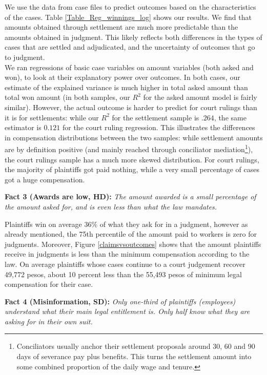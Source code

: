 \documentclass[11pt]{article}
\begin{document}
We use the data from case files to predict outcomes based on the characteristics of the cases. Table \ref{Table_Reg_winnings_log} shows our results. We find that amounts obtained through settlement are much more predictable than the amounts obtained in judgment. This likely reflects both differences in the types of cases that are settled and adjudicated, and the uncertainty of outcomes that go to judgment.   
\\
We ran regressions of basic case variables on amount variables (both asked and won), to look at their explanatory power over outcomes. In both cases, our estimate of the explained variance is much higher in total asked amount than total won amount (in both samples, our $R^2$ for the asked amount model is fairly similar). However, the actual outcome is harder to predict for court rulings than it is for settlements: while our $R^2$ for the settlement sample is $.264$, the same estimator is $0.121$ for the court ruling regression. This illustrates the differences in compensation distributions between the two samples: while settlement amounts are by definition positive (and mainly reached through conciliator mediation\footnote{Conciliators usually anchor their settlement proposals around 30, 60 and 90 days of severance pay plus benefits. This turns the settlement amount into some combined proportion of the daily wage and tenure.}), the court rulings sample has a much more skewed distribution. For court rulings, the majority of plaintiffs got paid nothing, while a very small percentage of cases got a huge compensation.


\vspace{.3in}
\begin{singlespace}
\textbf{Fact 3 (Awards are low, HD):} \emph{The amount awarded is a small percentage of the amount asked for, and is even less than what the law mandates.}
\end{singlespace}
\vspace{.1in}

Plaintiffs win on average 36\% of what they ask for in a judgment, however as already mentioned, the 75th percentile of the amount paid to workers is zero for judgments. Moreover, Figure \ref{claimsvsoutcomes} shows that the amount plaintiffs receive in judgments is less than the minimum compensation according to the law. On average plaintiffs whose cases continue to a court judgement recover 49,772 pesos, about 10 percent less than the 55,493 pesos of minimum legal compensation for their case. 

\vspace{.3in}
\begin{singlespace}
\textbf{Fact 4 (Misinformation, SD):} \emph{Only one-third of plaintiffs (employees) understand what their main legal entitlement is. Only half know what they are asking for in their own suit.}
\end{singlespace}
\vspace{.1in}
\end{document}
